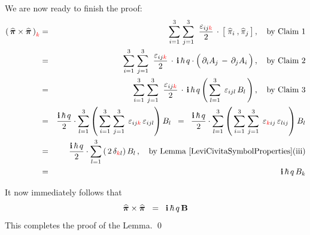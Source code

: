 \vskip 0.3cm
\noindent
We are now ready to finish the proof:
\begin{eqnarray*}
\left(\,
    \boldsymbol{\widehat{\pi}}
    \times
    \boldsymbol{\widehat{\pi}}
    \,\right)_{{\color{red}k}}
& = &
    \overset{3}{\underset{i=1}{\sum}}\;
    \overset{3}{\underset{j=1}{\sum}}\;\;
    \dfrac{\varepsilon_{ij\color{red}k}}{2}
    \,\cdot\,
    \left[\;
        \widehat{\pi}_{i}
        \, \overset{{\color{white}1}}{,} \,
        \widehat{\pi}_{j}
        \,\right],
    \quad
    \textnormal{by Claim 1}
\\
& = &
    \overset{3}{\underset{i=1}{\sum}}\;
    \overset{3}{\underset{j=1}{\sum}}\;\;
    \dfrac{\varepsilon_{ij\color{red}k}}{2}
    \,\cdot\,
    \i\,\hbar\,q\cdot\left(\,
        \partial_{i}A_{j}
        \,\overset{{\color{white}.}}{-}\,
        \partial_{j}A_{i}
        \,\right),
    \quad
    \textnormal{by Claim 2}
\\
& = &
    \overset{3}{\underset{i=1}{\sum}}\;
    \overset{3}{\underset{j=1}{\sum}}\;\;
    \dfrac{\varepsilon_{ij\color{red}k}}{2}
    \,\cdot\,
    \i\,\hbar\,q
    \left(\,
        \overset{3}{\underset{l=1}{\sum}}\;\,
        \varepsilon_{ijl}\,B_{l}
        \,\right),
    \quad
    \textnormal{by Claim 3}
\\
& = &
    \dfrac{\i\,\hbar\,q}{2}
    \cdot
    \overset{3}{\underset{l=1}{\sum}}
    \left(\,
        \overset{3}{\underset{i=1}{\sum}}\;
        \overset{3}{\underset{j=1}{\sum}}\;\,
        \varepsilon_{ij{\color{red}k}}\,
        \varepsilon_{ijl}
        \right)
    B_{l}
\;\; = \;\;
    \dfrac{\i\,\hbar\,q}{2}
    \cdot
    \overset{3}{\underset{l=1}{\sum}}
    \left(\,
        \overset{3}{\underset{i=1}{\sum}}\;
        \overset{3}{\underset{j=1}{\sum}}\;\,
        \varepsilon_{{\color{red}k}ij}\,
        \varepsilon_{lij}
        \right)
    B_{l}
\\
& = &
    \dfrac{\i\,\hbar\,q}{2}
    \cdot
    \overset{3}{\underset{l=1}{\sum}}
    \left(\,
        2\,\delta_{{\color{red}k}l}
        \right)
    B_{l}\,,
    \quad
    \textnormal{by Lemma \ref{LeviCivitaSymbolProperties}(iii)}
\\
& = &
    \i\,\hbar\,q\,B_{k}
\end{eqnarray*}

\vskip 0.3cm
\noindent
It now immediately follows that
\begin{equation*}
\boldsymbol{\widehat{\pi}}
\times
\boldsymbol{\widehat{\pi}}
\;\; = \;\;
    \mathbf{i}\,\hbar\,q\,\mathbf{B}
\end{equation*}
This completes the proof of the Lemma.
\qed

